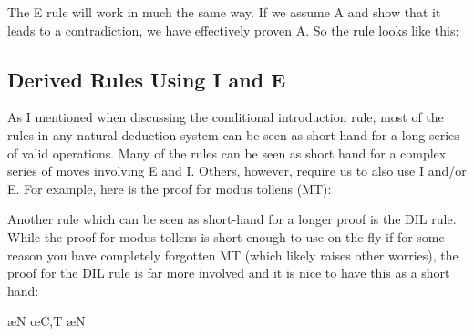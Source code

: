 The \enot E rule will work in much the same way. If we assume \enot A and show that it leads to a contradiction, we have effectively proven A. So the rule looks like this:

\subsection{Derived Rules Using \enot I and \enot E}

As I mentioned when discussing the conditional introduction rule, most of the rules in any natural deduction system can be seen as short hand for a long series of valid operations. Many of the rules can be seen as short hand for a complex series of moves involving \eif E and \eif I. Others, however, require us to also use \enot I and/or \enot E. For example, here is the proof for modus tollens (MT):
\begin{fitchproof}
\open
	 
	 
\close
{} 
\end{fitchproof}

Another rule which can be seen as short-hand for a longer proof is the DIL rule. While the proof for modus tollens is short enough to use on the fly if for some reason you have completely forgotten MT (which likely raises other worries), the proof for the DIL rule is far more involved and it is nice to have this as a short hand:
\begin{fitchproof}
\open
	 
	 \ae{N}
	 
	 \oe{C,T}
	 
	 \ae{N}
\close
{} 
\end{fitchproof}

\practiceproblems

